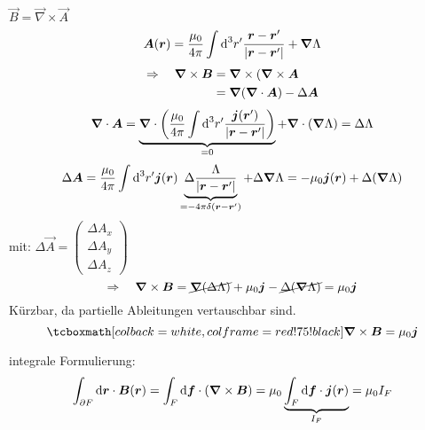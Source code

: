 $ \vec{B} = \vec{\nabla} \times \vec{A} $
\begin{equation*}
\bm{A}(\bm{r}) = \frac{\mu_0}{4 \pi} \int \textrm{d}^3 r' \frac{\bm{r} - \bm{r}'}{|\bm{r} - \bm{r}'|} + \bm{\nabla} \Lambda
\end{equation*}
\begin{align*}
\Rightarrow \quad \bm{\nabla} \times \bm{B} &= \bm{\nabla} \times (\bm{\nabla} \times \bm{A}\\
&= \bm{\nabla} (\bm{\nabla} \cdot \bm{A}) - \Delta \bm{A}
\end{align*}
\begin{equation*}
\bm{\nabla} \cdot \bm{A} = \underbrace{\bm{\nabla} \cdot \left(\frac{\mu_0}{4 \pi} \int \textrm{d} ^3 r' \frac{\bm{j}(\bm{r}')}{|\bm{r} - \bm{r}'|}\right)}_{=0} + \bm{\nabla} \cdot (\bm{\nabla} \Lambda) = \Delta \Lambda 
\end{equation*}
\begin{equation*}
\Delta \bm{A} = \frac{\mu_0}{4 \pi} \int \textrm{d}^3 r' \bm{j}(\bm{r}) \underbrace{\Delta \frac{\Lambda}{|\bm{r} - \bm{r}'|}}_{= - 4 \pi \delta(\bm{r} - \bm{r}')} + \Delta \bm{\nabla} \Lambda = - \mu_0 \bm{j}(\bm{r}) + \Delta (\bm{\nabla} \Lambda)
\end{equation*}
mit: $ \Delta \vec{A} = \begin{pmatrix}
\Delta A_x \\ \Delta A_y \\ \Delta A_z
\end{pmatrix} $
\begin{equation*}
\Rightarrow \quad \bm{\nabla} \times \bm{B} = \cancel{\bm{\nabla}(\Delta \Lambda)} + \mu_0 \bm{j} - \cancel{\Delta (\bm{\nabla} \Lambda)} = \mu_0 \bm{j}
\end{equation*}
Kürzbar, da partielle Ableitungen vertauschbar sind.
\begin{equation*}
\rmbox{\vabla \times \vec{B} = \mu_0 \vec{j}}
\end{equation*}
\begin{minipage}{.8\linewidth}
	integrale Formulierung:
	\begin{equation*}
	\int_{\partial F} \textrm{d} \bm{r} \cdot \bm{B} (\bm{r}) = \int_F \textrm{d} \bm{f} \cdot (\bm{\nabla} \times \bm{B}) = \mu_0 \underbrace{\int_F \textrm{d} \bm{f} \cdot \bm{j}(\bm{r})}_{I_F} = \mu_0 I_F
	\end{equation*}
\end{minipage}%
\begin{minipage}{.2\linewidth}
	\flushright
\end{minipage}%
